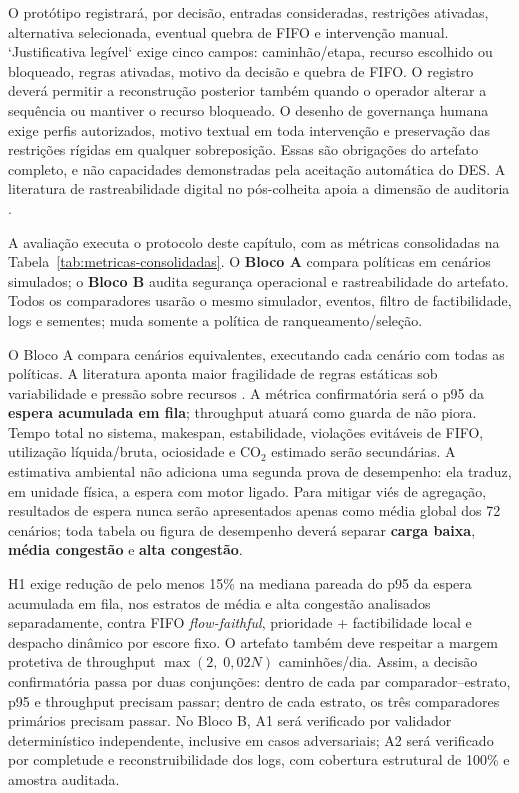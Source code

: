 \documentclass[
  12pt,
  oneside,
  a4paper,
  sumario=tradicional,
  brazil
]{abntex2}
\begin{document}
O prot\'otipo registrar\'a, por decis\~ao, entradas consideradas, restri\c{c}\~oes ativadas, alternativa selecionada, eventual quebra de FIFO e interven\c{c}\~ao manual. `Justificativa leg\'ivel` exige cinco campos: caminh\~ao/etapa, recurso escolhido ou bloqueado, regras ativadas, motivo da decis\~ao e quebra de FIFO. O registro dever\'a permitir a reconstru\c{c}\~ao posterior tamb\'em quando o operador alterar a sequ\^encia ou mantiver o recurso bloqueado. O desenho de governan\c{c}a humana exige perfis autorizados, motivo textual em toda interven\c{c}\~ao e preserva\c{c}\~ao das restri\c{c}\~oes r\'igidas em qualquer sobreposi\c{c}\~ao. Essas s\~ao obriga\c{c}\~oes do artefato completo, e n\~ao capacidades demonstradas pela aceita\c{c}\~ao autom\'atica do DES. A literatura de rastreabilidade digital no p\'os-colheita apoia a dimens\~ao de auditoria \parencite{dyckDigitalTwinsNovel2023}.

A avalia\c{c}\~ao executa o protocolo deste cap\'itulo, com as m\'etricas consolidadas na Tabela~\ref{tab:metricas-consolidadas}. O \textbf{Bloco A} compara pol\'iticas em cen\'arios simulados; o \textbf{Bloco B} audita seguran\c{c}a operacional e rastreabilidade do artefato. Todos os comparadores usar\~ao o mesmo simulador, eventos, filtro de factibilidade, logs e sementes; muda somente a pol\'itica de ranqueamento/sele\c{c}\~ao.

O Bloco A compara cen\'arios equivalentes, executando cada cen\'ario com todas as pol\'iticas. A literatura aponta maior fragilidade de regras est\'aticas sob variabilidade e press\~ao sobre recursos \parencite{abdelmagidComprehensiveReviewTruck2022a, nasiriPredictivereactiveCrossdockRescheduling2022, wangFlexibleStorageYard2023}. A m\'etrica confirmat\'oria ser\'a o p95 da \textbf{espera acumulada em fila}; throughput atuar\'a como guarda de n\~ao piora. Tempo total no sistema, makespan, estabilidade, viola\c{c}\~oes evit\'aveis de FIFO, utiliza\c{c}\~ao l\'iquida/bruta, ociosidade e $\mathrm{CO_2}$ estimado ser\~ao secund\'arias. A estimativa ambiental n\~ao adiciona uma segunda prova de desempenho: ela traduz, em unidade f\'isica, a espera com motor ligado. Para mitigar vi\'es de agrega\c{c}\~ao, resultados de espera nunca ser\~ao apresentados apenas como m\'edia global dos 72 cen\'arios; toda tabela ou figura de desempenho dever\'a separar \textbf{carga baixa}, \textbf{m\'edia congest\~ao} e \textbf{alta congest\~ao}.

H1 exige redu\c{c}\~ao de pelo menos 15\% na mediana pareada do p95 da espera acumulada em fila, nos estratos de m\'edia e alta congest\~ao analisados separadamente, contra FIFO \textit{flow-faithful}, prioridade + factibilidade local e despacho din\^amico por escore fixo. O artefato tamb\'em deve respeitar a margem protetiva de throughput $\max(2,\;0{,}02N)$ caminh\~oes/dia. Assim, a decis\~ao confirmat\'oria passa por duas conjun\c{c}\~oes: dentro de cada par comparador--estrato, p95 e throughput precisam passar; dentro de cada estrato, os tr\^es comparadores prim\'arios precisam passar. No Bloco B, A1 ser\'a verificado por validador determin\'istico independente, inclusive em casos adversariais; A2 ser\'a verificado por completude e reconstruibilidade dos logs, com cobertura estrutural de 100\% e amostra auditada.
\end{document}
